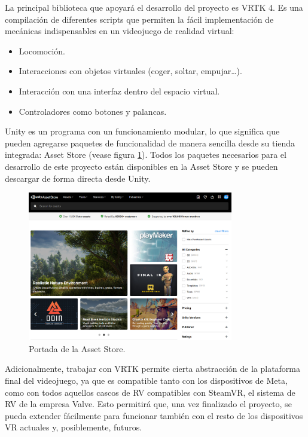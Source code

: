 La principal biblioteca que apoyará el desarrollo del proyecto es VRTK 4. Es una compilación de diferentes scripts que permiten la fácil implementación de mecánicas indispensables en un videojuego de realidad virtual:

\begin{itemize}
	\item{Locomoción.}

	\item{Interacciones con objetos virtuales (coger, soltar, empujar…).}

	\item{Interacción con una interfaz dentro del espacio virtual.}
	
	\item{Controladores como botones y palancas.}

\end{itemize}


Unity es un programa con un funcionamiento modular, lo que significa que pueden agregarse paquetes de funcionalidad de manera sencilla desde su tienda integrada: Asset Store (vease figura \ref{fig:TU_assetStore}). Todos los paquetes necesarios para el desarrollo de este proyecto están disponibles en la Asset Store y se pueden descargar de forma directa desde Unity.

\begin{figure}[H]
  \centering
\includegraphics[width=0.8\textwidth]{03.EstudioProblema/03.TecnologiaAUsar/00.Figuras/03.asset_store.png}
    \caption{Portada de la Asset Store.}
    \label{fig:TU_assetStore}
\end{figure}



Adicionalmente, trabajar con VRTK permite cierta abstracción de la plataforma final del videojuego, ya que es compatible tanto con los dispositivos de Meta, como con todos aquellos cascos de RV compatibles con SteamVR, el sistema de RV de la empresa Valve. Esto permitirá que, una vez finalizado el proyecto, se pueda extender fácilmente para funcionar también con el resto de los dispositivos VR actuales y, posiblemente, futuros.


\chapterend